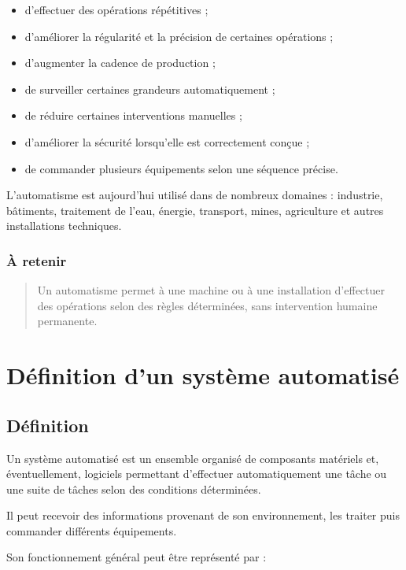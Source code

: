 \documentclass[12pt,a4paper]{book}
\begin{document}
\begin{itemize}
    \item d'effectuer des opérations répétitives ;
    \item d'améliorer la régularité et la précision de certaines opérations ;
    \item d'augmenter la cadence de production ;
    \item de surveiller certaines grandeurs automatiquement ;
    \item de réduire certaines interventions manuelles ;
    \item d'améliorer la sécurité lorsqu'elle est correctement conçue ;
    \item de commander plusieurs équipements selon une séquence précise.
\end{itemize}

L'automatisme est aujourd'hui utilisé dans de nombreux domaines : industrie, bâtiments, traitement de l'eau, énergie, transport, mines, agriculture et autres installations techniques.

\subsubsection*{À retenir}

\begin{quote}
Un automatisme permet à une machine ou à une installation d'effectuer des opérations selon des règles déterminées, sans intervention humaine permanente.
\end{quote}

\section{Définition d'un système automatisé}

\subsection{Définition}

Un système automatisé est un ensemble organisé de composants matériels et, éventuellement, logiciels permettant d'effectuer automatiquement une tâche ou une suite de tâches selon des conditions déterminées.

Il peut recevoir des informations provenant de son environnement, les traiter puis commander différents équipements.

Son fonctionnement général peut être représenté par :
\end{document}
